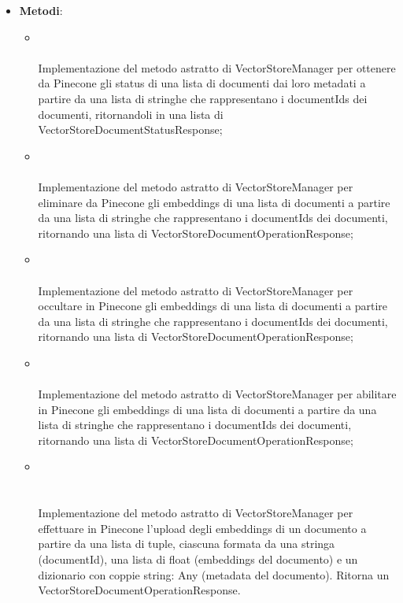 \documentclass[10pt, a4paper]{article}
\begin{document}
\label{VectorStorePineconeManagerDettaglio}
\begin{itemize}
    \item \textbf{Metodi}:
    \begin{itemize}
        \item {}\\ \\
        Implementazione del metodo astratto di VectorStoreManager per ottenere da Pinecone gli status di una lista di documenti dai loro metadati a partire da una lista di stringhe che rappresentano i documentIds dei documenti, ritornandoli in una lista di VectorStoreDocumentStatusResponse;
        \item {}\\ \\
        Implementazione del metodo astratto di VectorStoreManager per eliminare da Pinecone gli embeddings di una lista di documenti a partire da una lista di stringhe che rappresentano i documentIds dei documenti, ritornando una lista di VectorStoreDocumentOperationResponse;
        \item {}\\ \\
        Implementazione del metodo astratto di VectorStoreManager per occultare in Pinecone gli embeddings di una lista di documenti a partire da una lista di stringhe che rappresentano i documentIds dei documenti, ritornando una lista di VectorStoreDocumentOperationResponse;
        \item {}\\ \\
        Implementazione del metodo astratto di VectorStoreManager per abilitare in Pinecone gli embeddings di una lista di documenti a partire da una lista di stringhe che rappresentano i documentIds dei documenti, ritornando una lista di VectorStoreDocumentOperationResponse;
        \item {}\\ \\ \\
        Implementazione del metodo astratto di VectorStoreManager per effettuare in Pinecone l'upload degli embeddings di un documento a partire da una lista di tuple, ciascuna formata da una stringa (documentId), una lista di float (embeddings del documento) e un dizionario con coppie string: Any (metadata del documento). Ritorna un VectorStoreDocumentOperationResponse.
    \end{itemize}
\end{itemize}
\end{document}
